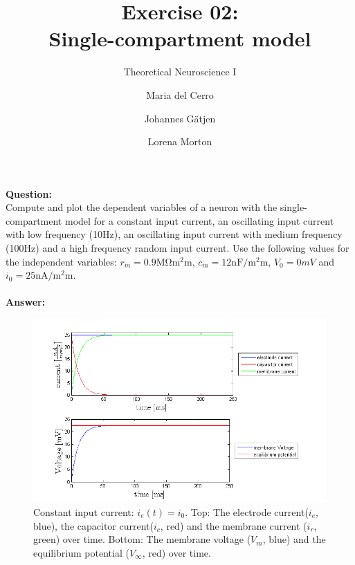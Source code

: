 \documentclass{scrartcl}
\title{Exercise 02:\\Single-compartment model}
\subtitle{Theoretical Neuroscience I}
\author{Maria del Cerro \and Johannes G\"atjen \and Lorena Morton}
\newcommand\Question{%
  \textbf{Question:}%
}
\newcommand\Answer{%
  \textbf{Answer:}%
}
\begin{document}
\maketitle
\Question\\
Compute and plot the dependent variables of a neuron with the single-compartment model for a constant input current, an oscillating input current with low frequency (10\si{Hz}), an oscillating input current with medium frequency (100\si{Hz}) and a high frequency random input current. Use the following values for the independent variables: $r_m = 0.9\si{\mega\ohm\square\milli\meter}$, $c_m = 12\si{\nano\farad\per\square\milli\meter}$, $V_0 = 0\si{mV}$ and $i_0 = 25 \si{\nano\ampere\per\square\milli\meter}$.
\\\\
\Answer\\
\begin{figure}[h]
\centering
\includegraphics[trim = {1.3cm 0 2cm 0.9cm}, width=\textwidth, clip]{../pics/constant}
\caption{\small{Constant input current: $i_e(t) = i_0$. Top: The electrode current($i_e$, blue), the capacitor current($i_c$, red) and the membrane current ($i_r$, green) over time. Bottom: The membrane voltage ($V_m$, blue) and the equilibrium potential ($V_\infty$, red) over time.}}
\label{constant}
\end{figure}
\end{document}
